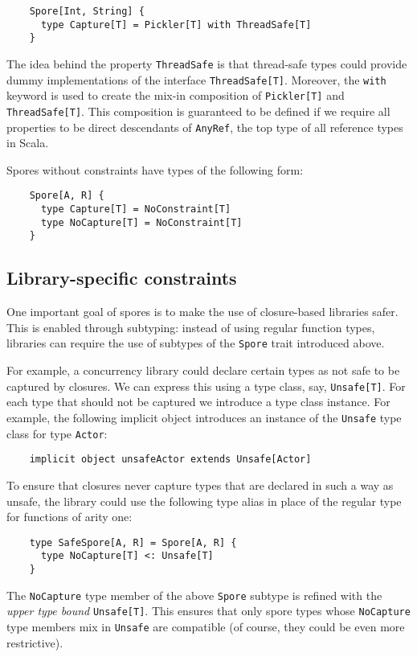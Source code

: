 \documentclass{llncs}
\begin{document}
\begin{lstlisting}
    Spore[Int, String] {
      type Capture[T] = Pickler[T] with ThreadSafe[T]
    }
\end{lstlisting}
\noindent
The idea behind the property \verb|ThreadSafe| is that thread-safe types could
provide dummy implementations of the interface \verb|ThreadSafe[T]|. Moreover,
the \verb|with| keyword is used to create the mix-in composition of
\verb|Pickler[T]| and \verb|ThreadSafe[T]|. This composition is guaranteed to
be defined if we require all properties to be direct descendants of
\verb|AnyRef|, the top type of all reference types in Scala.

Spores without constraints have types of the following form:
\begin{lstlisting}
    Spore[A, R] {
      type Capture[T] = NoConstraint[T]
      type NoCapture[T] = NoConstraint[T]
    }
\end{lstlisting}

\subsection{Library-specific constraints}

One important goal of spores is to make the use of closure-based libraries
safer. This is enabled through subtyping: instead of using regular function
types, libraries can require the use of subtypes of the \verb|Spore| trait
introduced above.

For example, a concurrency library could declare certain types as not safe to
be captured by closures. We can express this using a type class, say,
\verb|Unsafe[T]|. For each type that should not be captured we introduce a
type class instance. For example, the following implicit object introduces an
instance of the \verb|Unsafe| type class for type \verb|Actor|:

\begin{lstlisting}
    implicit object unsafeActor extends Unsafe[Actor]
\end{lstlisting}
\noindent
To ensure that closures never capture types that are declared in such a way as
unsafe, the library could use the following type alias in place of the regular
type for functions of arity one:

\begin{lstlisting}
    type SafeSpore[A, R] = Spore[A, R] {
      type NoCapture[T] <: Unsafe[T]
    }
\end{lstlisting}
\noindent
The \verb|NoCapture| type member of the above \verb|Spore| subtype is refined
with the {\em upper type bound} \verb|Unsafe[T]|. This ensures that only spore
types whose \verb|NoCapture| type members mix in \verb|Unsafe| are compatible
(of course, they could be even more restrictive).
\end{document}
